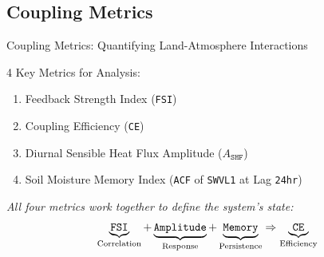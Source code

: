 \documentclass[8pt, aspectratio=169]{beamer}
\begin{document}
\subsection{Coupling Metrics}
\begin{frame}{Coupling Metrics: Quantifying Land-Atmosphere Interactions}
    \begin{block}{4 Key Metrics for Analysis:}
        \begin{enumerate}
            \item Feedback Strength Index (\texttt{FSI})
            \item Coupling Efficiency (\texttt{CE})
            \item Diurnal Sensible Heat Flux Amplitude ($A_{\texttt{SHF}}$)
            \item Soil Moisture Memory Index (\texttt{ACF} of \texttt{SWVL1} at Lag \texttt{24hr})
        \end{enumerate}
    \end{block}

    \vspace{0.4cm}
    \begin{center}
    \small \textit{All four metrics work together to define the system's state:}
    \[
        \underbrace{\text{\texttt{FSI}}}_{\text{Correlation}} + \underbrace{\text{\texttt{Amplitude}}}_{\text{Response}} + \underbrace{\text{\texttt{Memory}}}_{\text{Persistence}} \Rightarrow \underbrace{\text{\texttt{CE}}}_{\text{Efficiency}}
    \]
    \end{center}
\end{frame}
\end{document}
